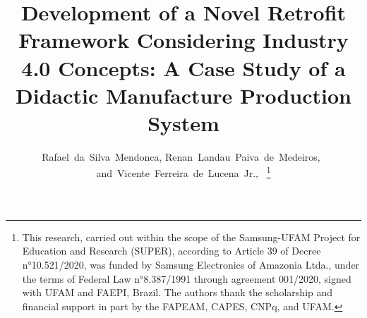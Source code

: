 \documentclass[journal]{IEEEtran}
\begin{document}
%
\title{Development of a Novel Retrofit Framework Considering Industry 4.0 Concepts: A Case Study of a Didactic Manufacture Production System}
%
%
%

\author{Rafael~da~Silva~Mendonca, %
        Renan~Landau~Paiva~de~Medeiros,~
        and~Vicente~Ferreira~de~Lucena~Jr.,~%
\thanks{This research, carried out within the scope of the Samsung-UFAM Project for Education and Research (SUPER), according to Article 39 of Decree n°10.521/2020, was funded by Samsung Electronics of Amazonia Ltda., under the terms of Federal Law n°8.387/1991 through agreement 001/2020, signed with UFAM and FAEPI, Brazil. The authors thank the scholarship and financial support in part by the FAPEAM, CAPES, CNPq, and UFAM.}}%

% 
%
\end{document}

